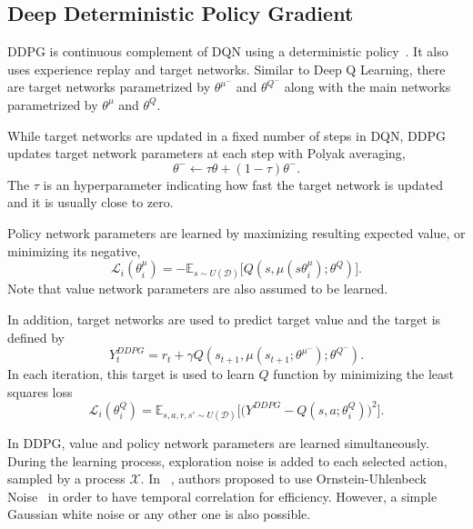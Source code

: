 \documentclass[a4paper, 12pt]{article} %
\begin{document}
\subsection{Deep Deterministic Policy Gradient}
DDPG is continuous complement of DQN using a deterministic policy~\cite{lillicrap_continuous_2019}. 
It also uses experience replay and target networks. 
Similar to Deep Q Learning, there are target networks parametrized by $\theta^{\mu^-}$ and $\theta^{Q^-}$ 
along with the main networks parametrized by $\theta^{\mu}$ and $\theta^{Q}$. 

While target networks are updated in a fixed number of steps in DQN, 
DDPG updates target network parameters at each step with Polyak averaging, 
\begin{equation}
\label{eqn:target_update}
\theta^- \leftarrow \tau \theta + (1-\tau) \theta^- .
\end{equation}
The $\tau$ is an hyperparameter indicating how fast the target network is updated and it is usually close to zero. 

Policy network parameters are learned by maximizing resulting expected value, or minimizing its negative,
\begin{equation}
\label{eqn:ddpg_policy_loss}
\mathcal{L}_i(\theta^\mu_i) = -\mathbb{E}_{s \sim U(\mathcal{D})} \Big[ Q(s, \mu(s\theta^\mu_i);\theta^Q) \Big].
\end{equation} 
Note that value network parameters are also assumed to be learned. 

In addition, target networks are used to predict target value and the target is defined by 
\begin{equation}
\label{eqn:ddpg_target}
Y_t^{DDPG} = r_t + \gamma Q(s_{t+1}, \mu(s_{t+1};\theta^{\mu^-});\theta^{Q^-}).
\end{equation}
In each iteration, this target is used to learn $Q$ function by minimizing the least squares loss 
\begin{equation}
\label{eqn:ddpg_loss}
\mathcal{L}_i(\theta^Q_i) = \mathbb{E}_{s,a,r,s'\sim U(\mathcal{D})}\Big[\big( Y^{DDPG} - Q(s,a;\theta^Q_i) \big) ^ 2 \Big].
\end{equation}

In DDPG, value and policy network parameters are learned simultaneously. 
During the learning process, exploration noise is added to each selected action, sampled by a process $\mathcal{X}$. 
In ~\cite{lillicrap_continuous_2019}, authors proposed to use Ornstein-Uhlenbeck Noise~\cite{uhlenbeck_theory_1930} in order to have temporal correlation for efficiency. 
However, a simple Gaussian white noise or any other one is also possible. 
\end{document}
